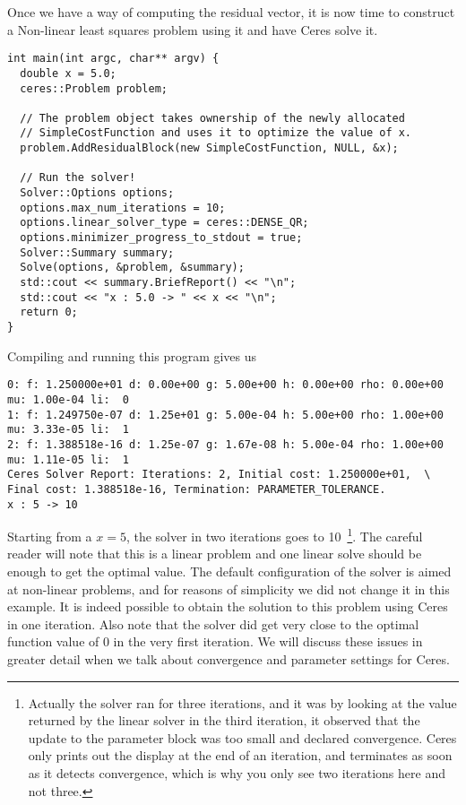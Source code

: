 Once we have a way of computing the residual vector, it is now time to construct a Non-linear least squares problem using it and have Ceres solve it.
\begin{verbatim}
int main(int argc, char** argv) {
  double x = 5.0;
  ceres::Problem problem;

  // The problem object takes ownership of the newly allocated
  // SimpleCostFunction and uses it to optimize the value of x.
  problem.AddResidualBlock(new SimpleCostFunction, NULL, &x);

  // Run the solver!
  Solver::Options options;
  options.max_num_iterations = 10;
  options.linear_solver_type = ceres::DENSE_QR;
  options.minimizer_progress_to_stdout = true;
  Solver::Summary summary;
  Solve(options, &problem, &summary);
  std::cout << summary.BriefReport() << "\n";
  std::cout << "x : 5.0 -> " << x << "\n";
  return 0;
}
\end{verbatim}

Compiling and running this program gives us
\begin{verbatim}
0: f: 1.250000e+01 d: 0.00e+00 g: 5.00e+00 h: 0.00e+00 rho: 0.00e+00 mu: 1.00e-04 li:  0
1: f: 1.249750e-07 d: 1.25e+01 g: 5.00e-04 h: 5.00e+00 rho: 1.00e+00 mu: 3.33e-05 li:  1
2: f: 1.388518e-16 d: 1.25e-07 g: 1.67e-08 h: 5.00e-04 rho: 1.00e+00 mu: 1.11e-05 li:  1
Ceres Solver Report: Iterations: 2, Initial cost: 1.250000e+01,  \
Final cost: 1.388518e-16, Termination: PARAMETER_TOLERANCE.
x : 5 -> 10
\end{verbatim}

Starting from a $x=5$, the solver in two iterations goes to 10~\footnote{Actually the solver ran for three iterations, and it was by looking at the value returned by the linear solver in the third iteration, it observed that the update to the parameter block was too small and declared convergence. Ceres only prints out the display at the end of an iteration, and terminates as soon as it detects convergence, which is why you only see two iterations here and not three.}. The careful reader will note that this is a linear problem and one linear solve should be enough to get the optimal value.  The default configuration of the solver is aimed at non-linear problems, and for reasons of simplicity we did not change it in this example. It is indeed possible to obtain the solution to this problem using Ceres in one iteration. Also note that the solver did get very close to the optimal function value of 0 in the very first iteration. We will discuss these issues in greater detail when we talk about convergence and parameter settings for Ceres.
